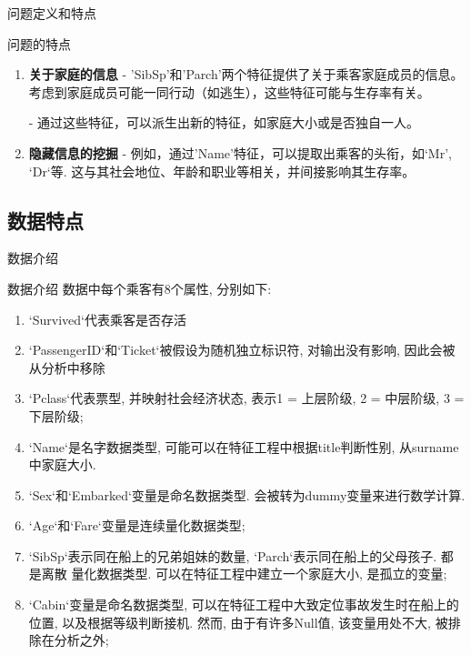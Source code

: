 \documentclass{beamer}
\begin{document}
\begin{frame}[fragile]{问题定义和特点}
{\begin{block}{问题的特点}
\begin{enumerate}
					- 这提示我们，在特征工程和模型建立时，应考虑这些社会和经济背景。

				\item<only@3> \textbf{关于家庭的信息}
					- 'SibSp'和'Parch'两个特征提供了关于乘客家庭成员的信息。考虑到家庭成员可能一同行动（如逃生），这些特征可能与生存率有关。

					- 通过这些特征，可以派生出新的特征，如家庭大小或是否独自一人。
				\item<only@3> \textbf{隐藏信息的挖掘}
					- 例如，通过'Name'特征，可以提取出乘客的头衔，如`Mr', `Dr`等. 这与其社会地位、年龄和职业等相关，并间接影响其生存率。

			\end{enumerate}
		\end{block}
	}
\end{frame}

\subsection{数据特点}
\begin{frame}[fragile]{数据介绍}
	\begin{block}{数据介绍}
		数据中每个乘客有8个属性, 分别如下:
		\begin{enumerate}
			\item<only@1> `Survived`代表乘客是否存活
			\item<only@1> `PassengerID`和`Ticket`被假设为随机独立标识符, 对输出没有影响, 因此会被从分析中移除
			\item<only@1> `Pclass`代表票型, 并映射社会经济状态, 表示1 = 上层阶级, 2 = 中层阶级, 3 = 下层阶级;
			\item<only@1> `Name`是名字数据类型, 可能可以在特征工程中根据title判断性别, 从surname中家庭大小.

			\item<only@2> `Sex`和`Embarked`变量是命名数据类型. 会被转为dummy变量来进行数学计算.
			\item<only@2> `Age`和`Fare`变量是连续量化数据类型;
			\item<only@2> `SibSp`表示同在船上的兄弟姐妹的数量, `Parch`表示同在船上的父母孩子. 都是离散
				量化数据类型. 可以在特征工程中建立一个家庭大小, 是孤立的变量;
			\item `Cabin`变量是命名数据类型, 可以在特征工程中大致定位事故发生时在船上的位置, 以及根据等级判断接机. 然而, 由于有许多Null值, 该变量用处不大, 被排除在分析之外;
		\end{enumerate}
	\end{block}
\end{frame}
\end{document}
